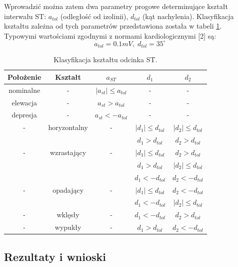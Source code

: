 Wprowadzić można zatem dwa parametry progowe determinujące kształt interwału ST: $ a_{tol} $ (odległość od izolinii), $ d_{tol} $ (kąt nachylenia). Klasyfikacja kształtu zależna od tych parametrów przedstawiona została w tabeli \ref{tab:ST_klasyfikacjaST}. Typowymi wartościami zgodnymi z normami kardiologicznymi [2] są:\\
\[ a_{tol} = 0.1 mV, \; d_{tol} = 35^\circ  \]
\begin{table}[H]
	\centering
	\caption{Klasyfikacja kształtu odcinka ST.}
	\label{tab:ST_klasyfikacjaST}
	\begin{tabular}{|c|c|c|c|c|}
	\hline
	Położenie & Kształt & $ a_{ST} $ & $ d_1 $ & $ d_2 $ \\ \hline
	nominalne	&	-	&	$ \left| a_{st} \right| \leq a_{tol} $	&	-	&	- \\ \hline
	elewacja	&	-	&	$ a_{st} > a_{tol} $					&	-	&	- \\ \hline
	depresja	&	-	&	$ a_{st} < -a_{tol} $					&	-	&	- \\ \hline
	- & horyzontalny & - & $ \left| d_1 \right| \leq d_{tol} $ & $ \left| d_2 \right| \leq d_{tol} $ \\ \hline
	\multirow{3}{*}{-} & \multirow{3}{*}{wzrastający} & \multirow{3}{*}{-} & $ d_1 > d_{tol} $						&	$ d_2 > d_{tol} $ \\ \cline{4-5}
	& & & $ \left| d_1 \right| \leq d_{tol} $	&	$ d_2 > d_{tol} $					\\ \cline{4-5}
	& & & $ d_1 > d_{tol} $						&	$ \left| d_2 \right| \leq d_{tol} $	\\ \hline
	\multirow{3}{*}{-} & \multirow{3}{*}{opadający} & \multirow{3}{*}{-} & $ d_1 < -d_{tol} $						&	$ d_2 < -d_{tol} $ \\ \cline{4-5}
	& & & $ \left| d_1 \right| \leq d_{tol} $	&	$ d_2 < -d_{tol} $					\\ \cline{4-5}
	& & & $ d_1 < -d_{tol} $					&	$ \left| d_2 \right| \leq d_{tol} $	\\ \hline
		-	&	wklęsły		&	-	&	$ d_1 < -d_{tol} $	&	$ d_2 > d_{tol} $	\\ \hline
		-	&	wypukły		&	-	&	$ d_1 > d_{tol}	$	&	$ d_2 < -d_{tol}$	\\ \hline
	\end{tabular}
\end{table}

\subsection{Rezultaty i wnioski}
